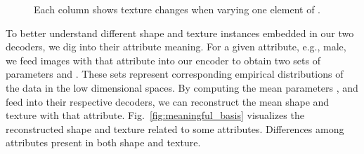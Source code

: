 \begin{figure}[t!]
\begin{center}
\small
\setlength{\tabcolsep}{3pt}
\vspace{-2mm}
\caption{\small Each column shows texture changes when varying one element of .}
\label{fig:varying_tex}\figvspace \vspace{-2mm}
\end{center}
\end{figure}



To better understand different shape and texture instances embedded in our two decoders, we dig into their attribute meaning.
For a given attribute, e.g., male, we feed images with that attribute  into our encoder to obtain two sets of parameters  and . 
These sets represent corresponding empirical distributions of the data in the low dimensional spaces. 
By computing the mean parameters , and feed into their respective decoders, we can reconstruct the mean shape and texture with that attribute. Fig.~\ref{fig:meaningful_basis} visualizes the reconstructed shape and texture related to some attributes. 
Differences among attributes present in both shape and texture.

